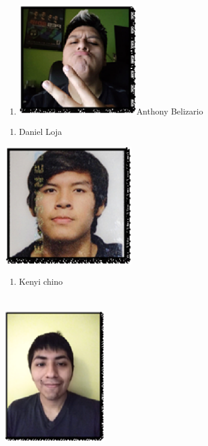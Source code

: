 \documentclass{article} %
\begin{document}
\begin{enumerate}
\item \textbf{ }\includegraphics*[width=2.04in, height=1.91in, keepaspectratio=false]{image2}Anthony Belizario
\end{enumerate}

\noindent 

\noindent 

\noindent 

\begin{enumerate}
\item  Daniel Loja
\end{enumerate}

\noindent \includegraphics*[width=2.21in, height=2.06in, keepaspectratio=false]{image3}

\begin{enumerate}
\item  Kenyi chino
\end{enumerate}

\noindent 
\section{\includegraphics*[width=1.73in, height=2.27in, keepaspectratio=false]{image4}}
\end{document}
